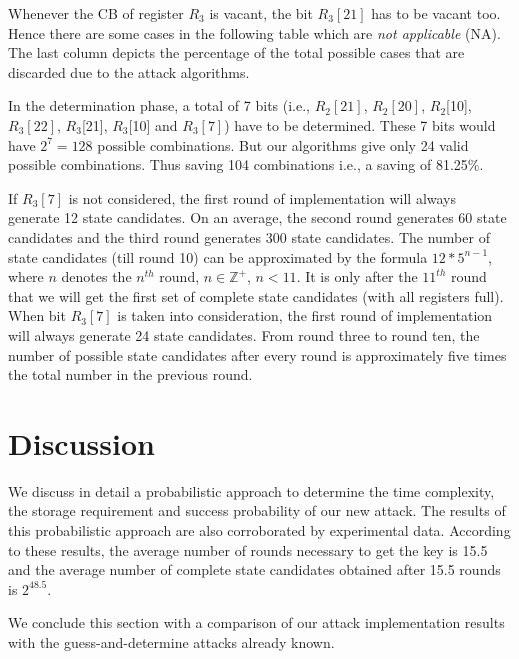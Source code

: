 \documentclass{llncs}
\begin{document}
Whenever the CB of register $R_{3}$ is vacant, the bit $R_{3}[21]$ has to be vacant too. Hence there are some cases in the following table which are \emph{not applicable} (NA). The last column depicts the percentage of the total possible cases that are discarded due to the attack algorithms.

In the determination phase, a total of 7 bits (i.e., $R_{2}[21]$, $R_{2}[20]$, $R_{2}$[10], $R_{3}[22]$, $R_{3}$[21], $R_{3}$[10] and $R_3[7]$) have to be determined. These 7 bits would have $2^7 = 128$ possible combinations. But our algorithms give only 24 valid possible combinations. Thus saving 104 combinations i.e., a saving of 81.25\%. 

If $R_{3}[7]$ is not considered, the first round of implementation will always generate 12 state candidates. On an average, the second round generates 60 state candidates and the third round generates 300 state candidates. The number of state candidates (till round 10) can be approximated by the formula $12 * 5^{n-1}$, where $n$ denotes the $n^{th}$ round, $n \in \mathbb{Z^{+}}$, $n < 11$. It is only after the $11^{th}$ round that we will get the first set of complete state candidates (with all registers full). When bit $R_{3}[7]$ is taken into consideration, the first round of implementation will always generate 24 state candidates. From round three to round ten, the number of possible state candidates after every round is approximately five times the total number in the previous round.

\section{Discussion}
We discuss in detail a probabilistic approach to determine the time complexity, the storage requirement and success probability of our new attack. The results of this probabilistic approach are also corroborated by experimental data.
According to these results, the average number of rounds necessary to get the key is 15.5 and the average number of complete state candidates obtained after 15.5 rounds is $2^{48.5}$.

We conclude this section with a comparison of our attack implementation results with the guess-and-determine attacks already known.
\end{document}
